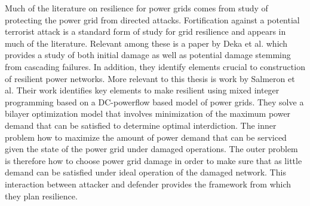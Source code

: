 Much of the literature on resilience for power grids comes from study of protecting the power grid from directed attacks. Fortification against a potential terrorist attack is a standard form of study for grid resilience and appears in much of the literature. Relevant among these is a paper by Deka et al. \cite{Deka2018} which provides a study of both initial damage as well as potential damage stemming from cascading failures. In addition, they identify  elements crucial to construction of resilient power networks. More relevant to this thesis is work by Salmeron et al. \cite{Salmeron2004} Their work identifies key elements to make resilient using mixed integer programming based on a DC-powerflow based model of power grids. They solve a bilayer optimization model that involves minimization of the maximum power demand that can be satisfied to determine optimal interdiction. The inner problem how to maximize the amount of power demand that can be serviced given the state of the power grid under damaged operations. The outer problem is therefore how to choose power grid damage in order to make sure that as little demand can be satisfied under ideal operation of the damaged network. This interaction between attacker and defender provides the framework from which they plan resilience.

